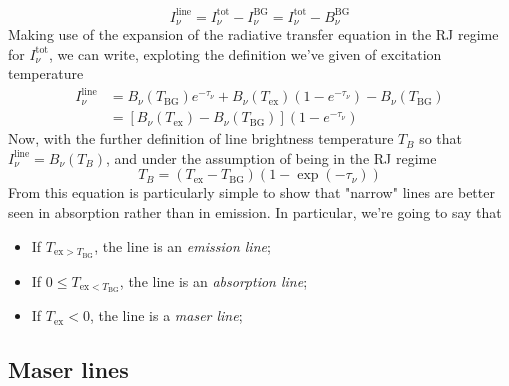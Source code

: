 \begin{equation}
    I_{\nu}^{\text{line}} = I_{\nu}^{\text{tot}} - I_{\nu}^{\text{BG}} = I_{\nu}^{\text{tot}} - B_{\nu}^{\text{BG}}
\end{equation}
Making use of the expansion of the radiative transfer equation in the RJ regime for $I_{\nu}^{\text{tot}}$, we can write, exploting the definition we've given of excitation temperature 
\begin{align*}
    I_{\nu}^{\text{line}} &= B_{\nu}(T_{\text{BG}})e^{-\tau_{\nu}} + B_{\nu}(T_{\text{ex}})(1-e^{-\tau_{\nu}}) - B_{\nu}(T_{\text{BG}})\\
    &= \left[B_{\nu}(T_{\text{ex}})-B_{\nu}(T_{\text{BG}})\right]\left(1-e^{-\tau_{\nu}}\right)
\end{align*}
Now, with the further definition of line brightness temperature $T_{B}$ so that $I_{\nu}^{\text{line}} = B_{\nu}(T_{B})$, and under the assumption of being in the RJ regime 
\begin{equation}
    \boxed{
        T_{B} = (T_{\text{ex}}-T_{\text{BG}})\left(1-\exp(-\tau_{\nu})\right)
    }
    \label{eq:brightnesstemperature-spectralradioline}
\end{equation}
From this equation is particularly simple to show that "narrow" lines are better seen in absorption rather than in emission. In particular, we're going to say that 
\begin{itemize}
    \item If $T_{\text{ex} > T_{\text{BG}}}$, the line is an \emph{emission line};
    \item If $0 \leq T_{\text{ex} < T_{\text{BG}}}$, the line is an \emph{absorption line};
    \item If $T_{\text{ex}} < 0$, the line is a \emph{maser line};
\end{itemize}

\subsection{Maser lines}

